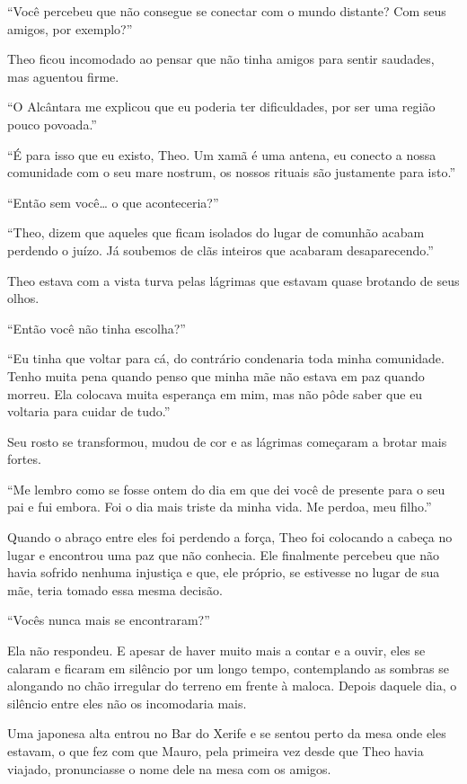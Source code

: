 ``Você percebeu que não consegue se conectar com o mundo distante? Com
seus amigos, por exemplo?''

Theo ficou incomodado ao pensar que não tinha amigos para sentir
saudades, mas aguentou firme.

``O Alcântara me explicou que eu poderia ter dificuldades, por ser uma
região pouco povoada.''

``É para isso que eu existo, Theo. Um xamã é uma antena, eu conecto a
nossa comunidade com o seu mare nostrum, os nossos rituais são
justamente para isto.''

``Então sem você\ldots{} o que aconteceria?''

``Theo, dizem que aqueles que ficam isolados do lugar de comunhão acabam
perdendo o juízo. Já soubemos de clãs inteiros que acabaram
desaparecendo.''

Theo estava com a vista turva pelas lágrimas que estavam quase brotando
de seus olhos.

``Então você não tinha escolha?''

``Eu tinha que voltar para cá, do contrário condenaria toda minha
comunidade. Tenho muita pena quando penso que minha mãe não estava em
paz quando morreu. Ela colocava muita esperança em mim, mas não pôde
saber que eu voltaria para cuidar de tudo.''

Seu rosto se transformou, mudou de cor e as lágrimas começaram a brotar
mais fortes.

``Me lembro como se fosse ontem do dia em que dei você de presente para o
seu pai e fui embora. Foi o dia mais triste da minha vida. Me perdoa,
meu filho.''

Quando o abraço entre eles foi perdendo a força, Theo foi colocando a
cabeça no lugar e encontrou uma paz que não conhecia. Ele finalmente
percebeu que não havia sofrido nenhuma injustiça e que, ele próprio, se
estivesse no lugar de sua mãe, teria tomado essa mesma decisão.

``Vocês nunca mais se encontraram?''

Ela não respondeu. E apesar de haver muito mais a contar e a ouvir, eles
se calaram e ficaram em silêncio por um longo tempo, contemplando as
sombras se alongando no chão irregular do terreno em frente à maloca.
Depois daquele dia, o silêncio entre eles não os incomodaria mais.

\asterisc


Uma japonesa alta entrou no Bar do Xerife e se sentou perto da mesa onde
eles estavam, o que fez com que Mauro, pela primeira vez desde que Theo
havia viajado, pronunciasse o nome dele na mesa com os amigos.

